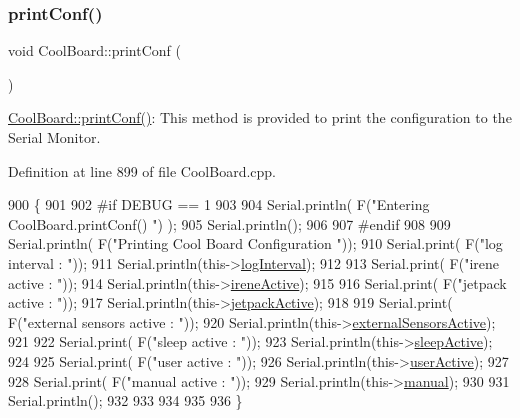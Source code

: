 \subsubsection{\texorpdfstring{print\+Conf()}{printConf()}}
{\footnotesize\ttfamily void Cool\+Board\+::print\+Conf (\begin{DoxyParamCaption}{ }\end{DoxyParamCaption})}

\hyperlink{class_cool_board_a486507b8f0981d3cc671ed31c2145755}{Cool\+Board\+::print\+Conf()}\+: This method is provided to print the configuration to the Serial Monitor. 

Definition at line 899 of file Cool\+Board.\+cpp.


\begin{DoxyCode}
900 \{
901 
902 \textcolor{preprocessor}{#if DEBUG == 1}
903     
904     Serial.println( F(\textcolor{stringliteral}{"Entering CoolBoard.printConf() "}) );
905     Serial.println();
906 
907 \textcolor{preprocessor}{#endif}
908 
909     Serial.println( F(\textcolor{stringliteral}{"Printing Cool Board Configuration "}));
910     Serial.print( F(\textcolor{stringliteral}{"log interval       : "}));
911     Serial.println(this->\hyperlink{class_cool_board_a84bc94413b64973e4aba8c467c97006c}{logInterval});
912 
913     Serial.print( F(\textcolor{stringliteral}{"irene active       : "}));
914     Serial.println(this->\hyperlink{class_cool_board_a9c3f7ac625481ee2ae802a25d97a4ae0}{ireneActive});
915 
916     Serial.print( F(\textcolor{stringliteral}{"jetpack active     : "}));
917     Serial.println(this->\hyperlink{class_cool_board_a9be03a913d26e558328935ca3b59a75e}{jetpackActive});
918 
919     Serial.print( F(\textcolor{stringliteral}{"external sensors active    : "}));
920     Serial.println(this->\hyperlink{class_cool_board_a638b00b76aeb819ecfd4c10b8cdd7bb7}{externalSensorsActive});
921 
922     Serial.print( F(\textcolor{stringliteral}{"sleep active       : "}));
923     Serial.println(this->\hyperlink{class_cool_board_a0a51b2287139f66c738101fb53139230}{sleepActive});
924 
925     Serial.print( F(\textcolor{stringliteral}{"user active        : "}));
926     Serial.println(this->\hyperlink{class_cool_board_a6395459131d6889a3005f79c7a35e964}{userActive});
927 
928     Serial.print( F(\textcolor{stringliteral}{"manual active      : "}));
929     Serial.println(this->\hyperlink{class_cool_board_a7c8e505a5804b109e112d5a03df6ea2b}{manual});
930 
931     Serial.println();
932 
933 
934 
935 
936 \}
\end{DoxyCode}
\mbox{\label{class_cool_board_ad03abdce2e65f520bbf2cff0f2d083cf}} 
